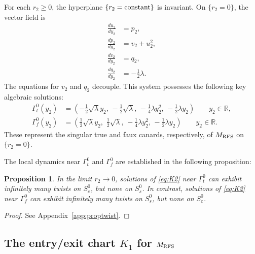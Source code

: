 \documentclass[11pt]{article}
\numberwithin{equation}{section}
\newtheorem{proposition}{Proposition}[section]
\begin{document}
For each $r_2 \ge 0$, the hyperplane $\{ r_2 = {\rm constant} \}$ is invariant.
On $\{ r_2 = 0 \}$, the vector field is 
\begin{equation} \label{eq:K2-on-r2=0}
\begin{split}
    \frac{du_2}{dy_2} &= p_2, \\ 
    \frac{dp_2}{dy_2} &= v_2 + u_2^2, \\
    \frac{dv_2}{dy_2} &= q_2, \\
    \frac{dq_2}{dy_2} &= -\frac{1}{2}\lambda.
\end{split}
\end{equation}
The equations for $v_2$ and $q_2$ decouple.
This system possesses the following key algebraic solutions:
\begin{equation} \label{eq:gamma_TF}
 \begin{split}
    \Gamma_t^0 (y_2) &= \left( -\frac{1}{2}\sqrt{\lambda} y_2, \, -\frac{1}{2} \sqrt{\lambda},  \, -\frac{1}{4} \lambda y_2^2, \, -\frac{1}{2}\lambda y_2 \right) \qquad y_2 \in \mathbb{R},\\
    \Gamma_f^0 (y_2) &= \left( \frac{1}{2}\sqrt{\lambda} y_2, \,\, \frac{1}{2} \sqrt{\lambda}, \, -\frac{1}{4} \lambda y_2^2, \, -\frac{1}{2}\lambda y_2 \right) \qquad y_2 \in \mathbb{R}.
\end{split}
\end{equation}
These represent the singular true and faux canards, respectively, of $M_{\rm RFS}$ on $\{ r_2=0 \}$.


The local dynamics near $\Gamma^0_t$ and $\Gamma_f^0$ are established in the following proposition: 
\begin{proposition}\label{prop:twist}
In the limit $r_2 \to 0$, solutions of \eqref{eq:K2} near $\Gamma_t^0$ can exhibit infinitely many twists on $S_c^0$, but none on $S_s^0$.
In contrast, solutions of \eqref{eq:K2} near $\Gamma_f^0$ can exhibit infinitely many twists on $S_s^0$, but none on $S_c^0$.
\end{proposition}

\begin{proof}
See Appendix~\ref{app:proptwist}.
\end{proof}

    

\subsection{The entry/exit chart \texorpdfstring{$K_1$ for $M_{\rm RFS}$}{Lg}} \label{sec:K1}
\end{document}
